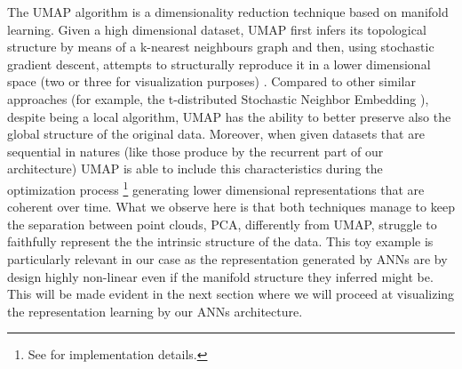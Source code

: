 The UMAP algorithm is a dimensionality reduction technique based on manifold learning. Given a high dimensional dataset, UMAP first infers its topological structure by means of a k-nearest neighbours graph and then, using stochastic gradient descent, attempts to structurally reproduce it in a lower dimensional space (two or three for visualization purposes) \cite{2018arXivUMAP}. Compared to other similar approaches (for example, the t-distributed Stochastic Neighbor Embedding \cite{van2008visualizing}), despite being a local algorithm, UMAP has the ability to better preserve also the global structure of the original data. Moreover, when given datasets that are sequential in natures (like those produce by the recurrent part of our architecture) UMAP is able to include this characteristics during the optimization process \footnote{See \cite{alignedumap} for implementation details.} generating lower dimensional representations that are coherent over time. What we observe here is that both techniques manage to keep the separation between point clouds, PCA, differently from UMAP, struggle to faithfully represent the the intrinsic structure of the data. This toy example is particularly relevant in our case as the representation generated by ANNs are by design highly non-linear even if the manifold structure they inferred might be. This will be made evident in the next section where we will proceed at visualizing the representation learning by our ANNs architecture.

